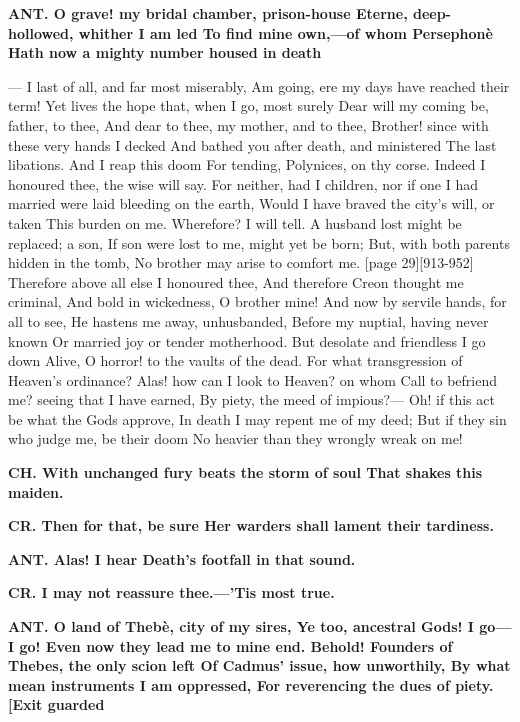\documentclass[11pt,letter]{book}
\begin{document}
\par \textbf{ANT. O grave! my bridal chamber, prison-house Eterne, deep-hollowed, whither I am led To find mine own,—of whom Persephonè Hath now a mighty number housed in death}
\par  — I last of all, and far most miserably, Am going, ere my days have reached their term! Yet lives the hope that, when I go, most surely Dear will my coming be, father, to thee, And dear to thee, my mother, and to thee, Brother! since with these very hands I decked And bathed you after death, and ministered The last libations. And I reap this doom For tending, Polynices, on thy corse. Indeed I honoured thee, the wise will say. For neither, had I children, nor if one I had married were laid bleeding on the earth, Would I have braved the city’s will, or taken This burden on me. Wherefore? I will tell. A husband lost might be replaced; a son, If son were lost to me, might yet be born; But, with both parents hidden in the tomb, No brother may arise to comfort me. [page 29][913-952] Therefore above all else I honoured thee, And therefore Creon thought me criminal, And bold in wickedness, O brother mine! And now by servile hands, for all to see, He hastens me away, unhusbanded, Before my nuptial, having never known Or married joy or tender motherhood. But desolate and friendless I go down Alive, O horror! to the vaults of the dead. For what transgression of Heaven’s ordinance? Alas! how can I look to Heaven? on whom Call to befriend me? seeing that I have earned, By piety, the meed of impious?— Oh! if this act be what the Gods approve, In death I may repent me of my deed; But if they sin who judge me, be their doom No heavier than they wrongly wreak on me!

\par \textbf{CH. With unchanged fury beats the storm of soul That shakes this maiden.}
\par 

\par \textbf{CR. Then for that, be sure Her warders shall lament their tardiness.}
\par 

\par \textbf{ANT. Alas! I hear Death’s footfall in that sound.}
\par 

\par \textbf{CR. I may not reassure thee.—’Tis most true.}
\par 

\par \textbf{ANT. O land of Thebè, city of my sires, Ye too, ancestral Gods! I go—I go! Even now they lead me to mine end. Behold! Founders of Thebes, the only scion left Of Cadmus’ issue, how unworthily, By what mean instruments I am oppressed, For reverencing the dues of piety.[Exit guarded}
\par 
\end{document}
